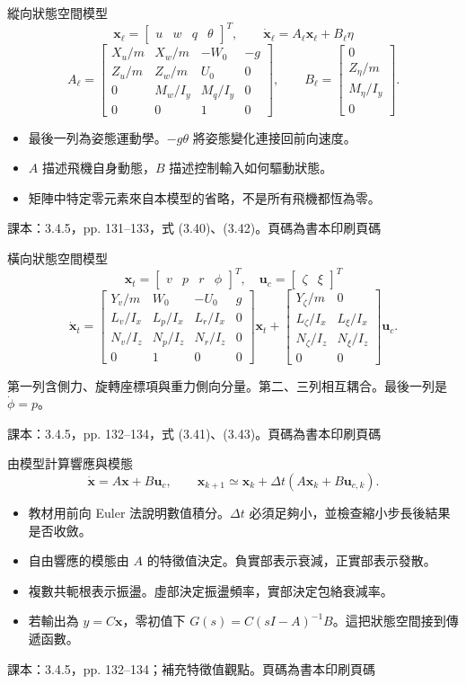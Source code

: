 \documentclass[aspectratio=169,11pt]{beamer}
\newcommand{\src}[1]{\par\vfill{\scriptsize\color{teal}#1}}
\newcommand{\slide}[3]{\begin{frame}[t]{#1}#3\src{#2}\end{frame}}
\newcommand{\bi}{\begin{itemize}\setlength{\itemsep}{5pt}}
\newcommand{\ei}{\end{itemize}}
\newcommand{\key}[1]{\par\medskip{\color{teal}\bfseries #1}\par\smallskip}
\newcommand{\bookslide}[3]{\slide{#1}{課本：#2。頁碼為書本印刷頁碼}{#3}}
\begin{document}
\bookslide{縱向狀態空間模型}{3.4.5，pp. 131--133，式 (3.40)、(3.42)}{
\small
\[\mathbf x_\ell=\begin{bmatrix}u&w&q&\theta\end{bmatrix}^{T},
\qquad\dot{\mathbf x}_\ell=A_\ell\mathbf x_\ell+B_\ell\eta\]
\[A_\ell=\begin{bmatrix}
X_u/m&X_w/m&-W_0&-g\\
Z_u/m&Z_w/m&U_0&0\\
0&M_w/I_y&M_q/I_y&0\\
0&0&1&0
\end{bmatrix},\qquad
B_\ell=\begin{bmatrix}0\\Z_\eta/m\\M_\eta/I_y\\0\end{bmatrix}.\]
\bi
\item 最後一列為姿態運動學。$-g\theta$ 將姿態變化連接回前向速度。
\item $A$ 描述飛機自身動態，$B$ 描述控制輸入如何驅動狀態。
\item 矩陣中特定零元素來自本模型的省略，不是所有飛機都恆為零。
\ei
}
\bookslide{橫向狀態空間模型}{3.4.5，pp. 132--134，式 (3.41)、(3.43)}{
\small
\[\mathbf x_t=\begin{bmatrix}v&p&r&\phi\end{bmatrix}^{T},
\quad\mathbf u_c=\begin{bmatrix}\zeta&\xi\end{bmatrix}^{T}\]
\[\dot{\mathbf x}_t=
\begin{bmatrix}
Y_v/m&W_0&-U_0&g\\
L_v/I_x&L_p/I_x&L_r/I_x&0\\
N_v/I_z&N_p/I_z&N_r/I_z&0\\
0&1&0&0
\end{bmatrix}\mathbf x_t+
\begin{bmatrix}
Y_\zeta/m&0\\
L_\zeta/I_x&L_\xi/I_x\\
N_\zeta/I_z&N_\xi/I_z\\
0&0
\end{bmatrix}\mathbf u_c.\]
\key{物理對照}第一列含側力、旋轉座標項與重力側向分量。第二、三列相互耦合。最後一列是 $\dot\phi=p$。
}
\bookslide{由模型計算響應與模態}{3.4.5，pp. 132--134；補充特徵值觀點}{
\[\dot{\mathbf x}=A\mathbf x+B\mathbf u_c,\qquad
\mathbf x_{k+1}\simeq\mathbf x_k+\Delta t(A\mathbf x_k+B\mathbf u_{c,k}).\]
\bi
\item 教材用前向 Euler 法說明數值積分。$\Delta t$ 必須足夠小，並檢查縮小步長後結果是否收斂。
\item 自由響應的模態由 $A$ 的特徵值決定。負實部表示衰減，正實部表示發散。
\item 複數共軛根表示振盪。虛部決定振盪頻率，實部決定包絡衰減率。
\item 若輸出為 $y=C\mathbf x$，零初值下 $G(s)=C(sI-A)^{-1}B$。這把狀態空間接到傳遞函數。
\ei
}
\end{document}

